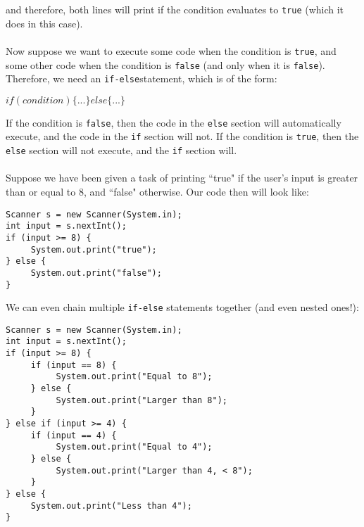 and therefore, both lines will print if the condition evaluates to \verb|true| (which it does in this case).
\\ \\
Now suppose we want to execute some code when the condition is \verb|true|, and some other code when the condition is \verb|false| (and only when it is \verb|false|). Therefore, we need an \verb|if-else|statement, which is of the form:
\begin{center}
$if(condition) \{...\} else \{...\}$
\end{center}
If the condition is \verb|false|, then the code in the \verb|else| section will automatically execute, and the code in the \verb|if| section will not. If the condition is \verb|true|, then the \verb|else| section will not execute, and the \verb|if| section will.
\\ \\
Suppose we have been given a task of printing ``true" if the user's input is greater than or equal to 8, and ``false" otherwise. Our code then will look like:
\begin{lstlisting}
Scanner s = new Scanner(System.in);
int input = s.nextInt();
if (input >= 8) {
     System.out.print("true");
} else {
     System.out.print("false");
}
\end{lstlisting}
We can even chain multiple \verb|if-else| statements together (and even nested ones!):
\begin{lstlisting}
Scanner s = new Scanner(System.in);
int input = s.nextInt();
if (input >= 8) {
     if (input == 8) {
          System.out.print("Equal to 8");
     } else {
          System.out.print("Larger than 8");
     }
} else if (input >= 4) {
     if (input == 4) {
          System.out.print("Equal to 4");
     } else {
          System.out.print("Larger than 4, < 8");
     }
} else {
     System.out.print("Less than 4");
}
\end{lstlisting}

